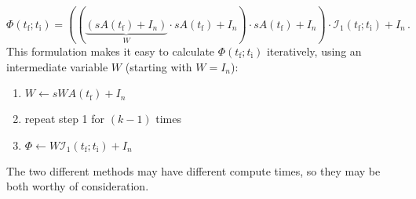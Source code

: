 \documentclass[utf8,english,DIV=12]{scrartcl}
\newcommand{\ti}{\ensuremath{t_{\text{i}}}}
\newcommand{\tf}{\ensuremath{t_{\text{f}}}}
\newcommand{\I}{\ensuremath{\mathcal{I}}}
\newcommand{\eye}[1]{\ensuremath{I_{#1}}}
\begin{document}
\begin{equation}
  \label{eq:PhiHorner}
  \Phi(\tf;\ti)=((\underbrace{(sA(\tf) + \eye{n})}_{W}\cdot sA(\tf) + \eye{n})\cdot sA(\tf) + \eye{n}) \cdot\I_1(\tf;\ti) + \eye{n}\,.
\end{equation}
This formulation makes it easy to calculate $\Phi(\tf;\ti)$ iteratively, using an intermediate variable $W$ (starting with $W=\eye{n}$):
\begin{enumerate}
\item $W \leftarrow s W A(\tf) + \eye{n}$
\item repeat step 1 for $(k-1)$ times
\item $\Phi \leftarrow W \I_1(\tf;\ti) + \eye{n}$
\end{enumerate}
The two different methods may have different compute times, so they
may be both worthy of consideration.
\end{document}

